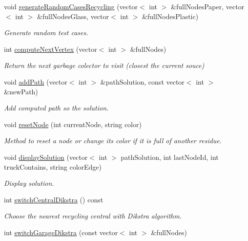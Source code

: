 \begin{DoxyCompactItemize}
void \hyperlink{classSmartWaste_ad794e60b6202dc3a1e38d028be2195d1}{generate\+Random\+Cases\+Recycling} (vector$<$ int $>$ \&full\+Nodes\+Paper, vector$<$ int $>$ \&full\+Nodes\+Glass, vector$<$ int $>$ \&full\+Nodes\+Plastic)
\begin{DoxyCompactList}\small\item\em Generate random test cases. \end{DoxyCompactList}\item 
int \hyperlink{classSmartWaste_a5d8ac088738eff0f301a44468e64cd1a}{compute\+Next\+Vertex} (vector$<$ int $>$ \&full\+Nodes)
\begin{DoxyCompactList}\small\item\em Return the next garbage colector to visit (closest the current souce) \end{DoxyCompactList}\item 
void \hyperlink{classSmartWaste_aa55aa107bef64f322ea140103888c40b}{add\+Path} (vector$<$ int $>$ \&path\+Solution, const vector$<$ int $>$ \&new\+Path)
\begin{DoxyCompactList}\small\item\em Add computed path so the solution. \end{DoxyCompactList}\item 
void \hyperlink{classSmartWaste_a08307d41711fbdeb0993c146201f0e39}{reset\+Node} (int current\+Node, string color)
\begin{DoxyCompactList}\small\item\em Method to reset a node or change its color if it is full of another residue. \end{DoxyCompactList}\item 
void \hyperlink{classSmartWaste_ace7f7f1d899892011914180c52dd1d9b}{display\+Solution} (vector$<$ int $>$ path\+Solution, int last\+Node\+Id, int truck\+Contains, string color\+Edge)
\begin{DoxyCompactList}\small\item\em Display solution. \end{DoxyCompactList}\item 
int \hyperlink{classSmartWaste_a12ed73d4cb4116b279676f0393aa6c3b}{switch\+Central\+Dikstra} () const 
\begin{DoxyCompactList}\small\item\em Choose the nearest recycling central with Dikstra algorithm. \end{DoxyCompactList}\item 
int \hyperlink{classSmartWaste_aae9728f175078ad6323c67fb0b0afce0}{switch\+Garage\+Dikstra} (const vector$<$ int $>$ \&full\+Nodes)

\end{DoxyCompactItemize}

